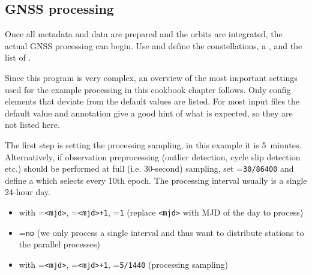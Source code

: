 \subsection{GNSS processing}\label{cookbook.gnssNetwork:processing}

Once all metadata and data are prepared and the orbits are integrated, the actual GNSS processing can begin.
Use  and define the 
constellations, a , and
the list of .

Since this program is very complex, an overview of the most important settings used for the example
processing in this cookbook chapter follows. Only config elements that deviate from the default values are listed.
For most input files the default value and annotation give a good hint of what is expected, so they are not
listed here.

The first step is setting the processing sampling, in this example it is 5~minutes. Alternatively, if observation
preprocessing (outlier detection, cycle slip detection etc.) should be performed at full (i.e. 30-second) sampling,
set =\verb|30/86400| and define a 
which selects every 10th epoch. The processing interval usually is a single 24-hour day.
\begin{itemize}
  \item {} with =\verb|<mjd>|,
        =\verb|<mjd>+1|, =\verb|1| (replace \verb|<mjd>| with MJD of the day to process)
  \item {}=\verb|no| (we only process a single interval and thus want to distribute stations to the parallel processes)
  \item {} with =\verb|<mjd>|,
        =\verb|<mjd>+1|, =\verb|5/1440| (processing sampling)
\end{itemize}


